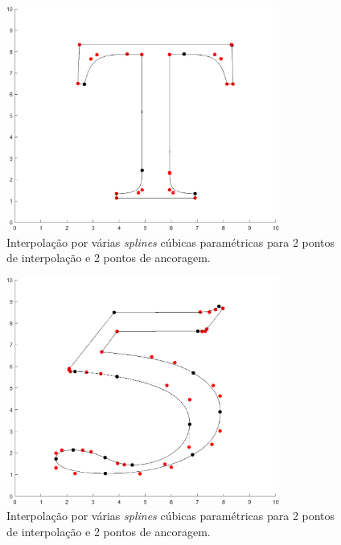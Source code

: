 \documentclass{article}
\begin{document}
\begin{enumerate}
\begin{enumerate}
                    \begin{figure}[!h]
                        \centering
                        \includegraphics[width=0.8\textwidth]{t.png}
                        \caption{Interpolação por várias \textit{splines} cúbicas paramétricas
                        para 2 pontos de interpolação e 2 pontos de ancoragem.}
                        \label{fig:t}
                    \end{figure}

                    \begin{figure}[!h]
                        \centering
                        \includegraphics[width=0.8\textwidth]{5.png}
                        \caption{Interpolação por várias \textit{splines} cúbicas paramétricas
                        para 2 pontos de interpolação e 2 pontos de ancoragem.}
                        \label{fig:5}
                    \end{figure}
                                        
            \end{enumerate}

    \end{enumerate}
\end{document}
